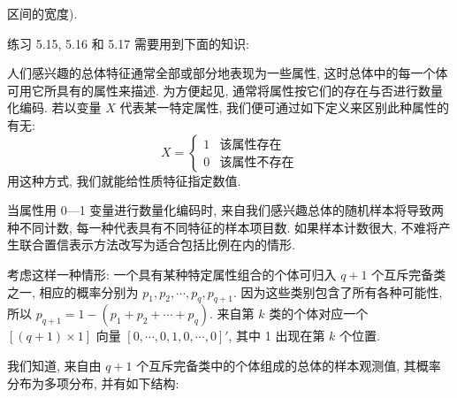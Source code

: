 区间的宽度).

练习 5.15, 5.16 和 5.17 需要用到下面的知识:

人们感兴趣的总体特征通常全部或部分地表现为一些属性, 这时总体中的每一个体可用它所具有的属性来描述. 为方便起见, 通常将属性按它们的存在与否进行数量化编码. 若以变量 $X$ 代表某一特定属性, 我们便可通过如下定义来区别此种属性的有无:
\[
X=\begin{cases}
1 & \text{该属性存在}\\
0 & \text{该属性不存在}
\end{cases}
\]
用这种方式, 我们就能给性质特征指定数值.

当属性用 0—1 变量进行数量化编码时, 来自我们感兴趣总体的随机样本将导致两种不同计数, 每一种代表具有不同特征的样本项目数. 如果样本计数很大, 不难将产生联合置信表示方法改写为适合包括比例在内的情形.

考虑这样一种情形: 一个具有某种特定属性组合的个体可归入 $q+1$ 个互斥完备类之一, 相应的概率分别为 $p_1,p_2,\cdots,p_q,p_{q+1}$. 因为这些类别包含了所有各种可能性, 所以 $p_{q+1}=1-(p_1+p_2+\cdots+p_q)$. 来自第 $k$ 类的个体对应一个 $[(q+1)\times1]$ 向量 $[0,\cdots,0,1,0,\cdots,0]'$, 其中 1 出现在第 $k$ 个位置.

我们知道, 来自由 $q+1$ 个互斥完备类中的个体组成的总体的样本观测值, 其概率分布为多项分布, 并有如下结构:

